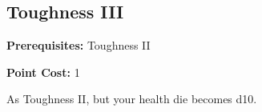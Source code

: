 \subsection*{Toughness III}\label{feat:toughness3}

\noindent
\textbf{Prerequisites:} Toughness II

\noindent
\textbf{Point Cost:} 1 

As Toughness II, but your health die becomes d10.
